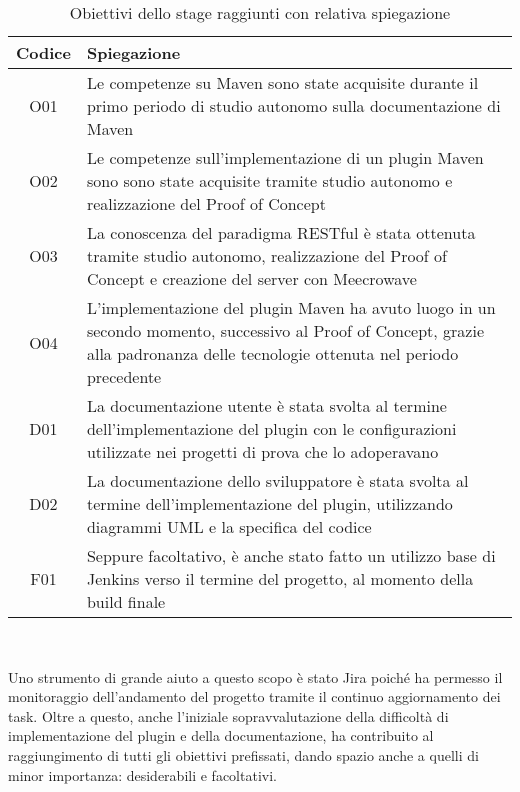     \begin{table}[H]
        {\def\arraystretch{1.5}
        \begin{tabularx}{\textwidth}{cX}
            \rowcolor{beautyblue}
            \textbf{Codice} &
            \textbf{Spiegazione} \\ \hline

            O01 & Le competenze su Maven sono state acquisite durante il primo periodo di studio autonomo sulla documentazione di Maven \\
            O02 & Le competenze sull'implementazione di un plugin Maven sono sono state acquisite tramite studio autonomo e realizzazione del Proof of Concept \\
            O03 & La conoscenza del paradigma RESTful è stata ottenuta  tramite studio autonomo, realizzazione del Proof of Concept e creazione del server con Meecrowave \\
            O04 & L'implementazione del plugin Maven ha avuto luogo in un secondo momento, successivo al Proof of Concept, grazie alla padronanza delle tecnologie ottenuta nel periodo precedente \\
            D01 & La documentazione utente è stata svolta al termine dell'implementazione del plugin con le configurazioni utilizzate nei progetti di prova che lo adoperavano \\
            D02 & La documentazione dello sviluppatore è stata svolta al termine dell'implementazione del plugin, utilizzando diagrammi UML e la specifica del codice \\
            F01 & Seppure facoltativo, è anche stato fatto un utilizzo base di Jenkins verso il termine del progetto, al momento della build finale \\
            
        \end{tabularx}} \\
    \caption{Obiettivi dello stage raggiunti con relativa spiegazione}
    \label{tabellaObiettiviRaggiunti}
    \end{table}

    Uno strumento di grande aiuto a questo scopo è stato Jira poiché ha permesso il monitoraggio dell'andamento del progetto tramite il continuo aggiornamento dei task.
    Oltre a questo, anche l'iniziale sopravvalutazione della difficoltà di implementazione del plugin e della documentazione, ha contribuito al raggiungimento di tutti gli obiettivi prefissati, dando spazio anche a quelli di minor importanza: desiderabili e facoltativi. 


